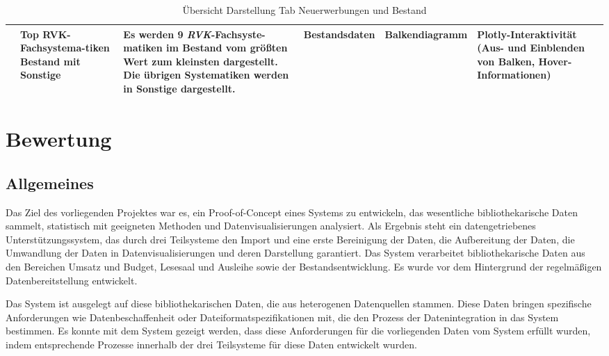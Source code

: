 \begin{table}[H]
\begin{adjustbox}{max width=\textwidth}
\begin{tabular}{p{}p{}p{}p{}p{}p{}}
                        &Top RVK-Fachsystema-tiken Bestand mit Sonstige&Es werden  9 \textit{\acrshort{RVK}}-Fachsyste-matiken im Bestand vom größten Wert zum kleinsten dargestellt. Die übrigen Systematiken werden in Sonstige dargestellt.&Bestandsdaten&Balkendiagramm&Plotly-Interaktivität (Aus- und Einblenden von Balken, Hover-Informationen)\\

        \bottomrule
        \end{tabular}
        \end{adjustbox}
        \caption{%
            Übersicht Darstellung Tab Neuerwerbungen und Bestand
        }
        \label{tab:Darstellung Tab Neuerwerbungen und Bestand}
        \end{table}
    \endgroup

\section{Bewertung}

\subsection{Allgemeines}
\label{chap:five_three_one}
Das Ziel des vorliegenden Projektes war es, ein Proof-of-Concept eines Systems zu entwickeln, 
das wesentliche bibliothekarische Daten sammelt, statistisch mit geeigneten Methoden und
Datenvisualisierungen analysiert. Als Ergebnis steht ein datengetriebenes 
Unterstützungssystem, das durch drei Teilsysteme den Import und eine erste Bereinigung der Daten,
die Aufbereitung der Daten, die Umwandlung der Daten in Datenvisualisierungen und deren Darstellung garantiert. 
Das System verarbeitet bibliothekarische Daten aus den Bereichen Umsatz und Budget, Lesesaal und Ausleihe 
sowie der Bestandsentwicklung. Es wurde vor dem Hintergrund der regelmäßigen Datenbereitstellung entwickelt.

Das System ist ausgelegt auf diese bibliothekarischen Daten, die aus heterogenen Datenquellen stammen.
Diese Daten bringen spezifische Anforderungen wie Datenbeschaffenheit oder Dateiformatspezifikationen mit, 
die den Prozess der Datenintegration in das System bestimmen. Es konnte mit dem System gezeigt werden, 
dass diese Anforderungen für die vorliegenden Daten vom System erfüllt wurden, indem entsprechende Prozesse innerhalb
der drei Teilsysteme für diese Daten entwickelt wurden.

